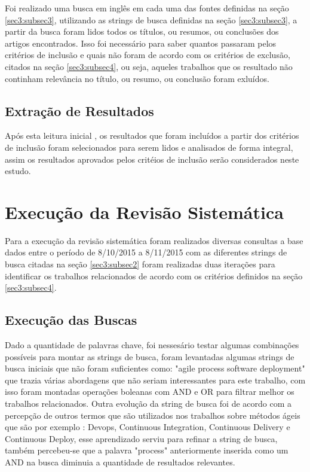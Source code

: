 \documentclass[12pt]{article}
\begin{document}
Foi realizado uma busca em inglês em cada uma das fontes definidas na seção \ref{sec3:subsec3}, utilizando as strings de busca definidas na seção \ref{sec3:subsec3}, a partir da busca foram lidos todos os títulos, ou resumos, ou conclusões dos artigos encontrados. Isso foi necessário para saber quantos passaram pelos critérios de inclusão e quais não foram de acordo com os critérios de exclusão, citados na seção \ref{sec3:subsec4}, ou seja, aqueles trabalhos que os resultado não continham relevância no título, ou resumo, ou conclusão foram exluídos.

\subsection{Extração de Resultados} \label{sec3:subsec6}

Após  esta leitura inicial ,  os  resultados que foram incluídos a partir dos critérios de inclusão foram  selecionados  para  serem  lidos e  analisados de forma integral, assim os resultados aprovados pelos critéios de inclusão serão considerados neste estudo.

\section{Execução da Revisão Sistemática} \label{sec4}

Para a execução da revisão sistemática foram realizados diversas consultas a base dados entre o período de  8/10/2015 a 8/11/2015 com as diferentes strings de busca citadas na seção \ref{sec3:subsec2} foram realizadas duas iterações para identificar os trabalhos relacionados de acordo com os critérios definidos na seção \ref{sec3:subsec4}.

\subsection{Execução das Buscas} \label{sec4:subsec1}

Dado a quantidade de palavras chave, foi nessesário testar algumas combinações possíveis para montar as strings de busca, foram levantadas algumas strings de busca iniciais que não foram suficientes como: "agile process software deployment" que trazia várias abordagens que não seriam interessantes para este trabalho, com isso foram montadas operações boleanas com AND e OR para filtrar melhor os trabalhos relacionados. Outra evolução da string de busca foi de acordo com a percepção de outros termos que são utilizados nos trabalhos sobre métodos ágeis que são por exemplo : Devops, Continuous Integration, Continuous Delivery e Continuous Deploy, esse aprendizado serviu para refinar a string de busca, também percebeu-se que a palavra "process" anteriormente inserida como um AND na busca diminuia a quantidade de resultados relevantes.
\end{document}
